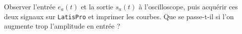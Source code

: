 \begin{protocole}
 \item  Observer l'entrée $e_a(t)$ et la sortie $s_a(t)$ à l'oscilloscope, puis acquérir ces deux signaux sur \texttt{LatisPro} et imprimer les courbes.
 Que se passe-t-il si l'on augmente trop l’amplitude en entrée ?
\end{protocole}

